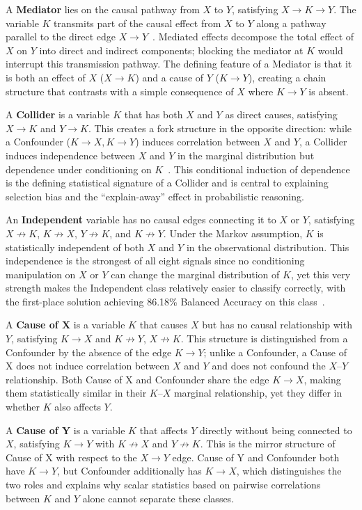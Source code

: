 A \textbf{Mediator} lies on the causal pathway from $X$ to $Y$, satisfying $X\to K\to Y$. The variable $K$ transmits part of the causal effect from $X$ to $Y$ along a pathway parallel to the direct edge $X\to Y$~\cite{peters2017elements}. Mediated effects decompose the total effect of $X$ on $Y$ into direct and indirect components; blocking the mediator at $K$ would interrupt this transmission pathway. The defining feature of a Mediator is that it is both an effect of $X$ ($X\to K$) and a cause of $Y$ ($K\to Y$), creating a chain structure that contrasts with a simple consequence of $X$ where $K\to Y$ is absent.

A \textbf{Collider} is a variable $K$ that has both $X$ and $Y$ as direct causes, satisfying $X\to K$ and $Y\to K$. This creates a fork structure in the opposite direction: while a Confounder ($K\to X, K\to Y$) induces correlation between $X$ and $Y$, a Collider induces independence between $X$ and $Y$ in the marginal distribution but dependence under conditioning on $K$~\cite{pearl2009causality}. This conditional induction of dependence is the defining statistical signature of a Collider and is central to explaining selection bias and the ``explain-away'' effect in probabilistic reasoning.

An \textbf{Independent} variable has no causal edges connecting it to $X$ or $Y$, satisfying $X\not\to K$, $K\not\to X$, $Y\not\to K$, and $K\not\to Y$. Under the Markov assumption, $K$ is statistically independent of both $X$ and $Y$ in the observational distribution. This independence is the strongest of all eight signals since no conditioning manipulation on $X$ or $Y$ can change the marginal distribution of $K$, yet this very strength makes the Independent class relatively easier to classify correctly, with the first-place solution achieving 86.18\% Balanced Accuracy on this class~\cite{olivetti2025adialab}.

A \textbf{Cause of X} is a variable $K$ that causes $X$ but has no causal relationship with $Y$, satisfying $K\to X$ and $K\not\to Y$, $X\not\to K$. This structure is distinguished from a Confounder by the absence of the edge $K\to Y$; unlike a Confounder, a Cause of X does not induce correlation between $X$ and $Y$ and does not confound the $X$--$Y$ relationship. Both Cause of X and Confounder share the edge $K\to X$, making them statistically similar in their $K$--$X$ marginal relationship, yet they differ in whether $K$ also affects $Y$.

A \textbf{Cause of Y} is a variable $K$ that affects $Y$ directly without being connected to $X$, satisfying $K\to Y$ with $K\not\to X$ and $Y\not\to K$. This is the mirror structure of Cause of X with respect to the $X\to Y$ edge. Cause of Y and Confounder both have $K\to Y$, but Confounder additionally has $K\to X$, which distinguishes the two roles and explains why scalar statistics based on pairwise correlations between $K$ and $Y$ alone cannot separate these classes.

